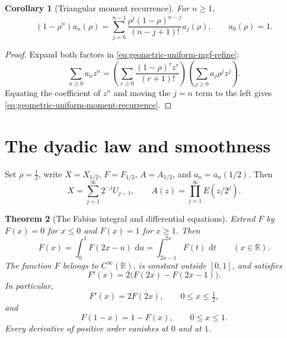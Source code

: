 \documentclass[11pt,oneside,openany]{book}
\newtheorem{theorem}{Theorem}[chapter]
\newtheorem{corollary}[theorem]{Corollary}
\theoremstyle{definition}
\theoremstyle{remark}
\newcommand{\R}{\mathbb R}
\newcommand{\dd}{\,\mathrm d}
\begin{document}
\begin{corollary}[Triangular moment recurrence]\label{cor:geometric-uniform-moment-recurrence}
For $n\ge1$,
\begin{equation}
 (1-\rho^n)a_n(\rho)
 =\sum_{j=0}^{n-1}
 \frac{\rho^j(1-\rho)^{n-j}}{(n-j+1)!}a_j(\rho),
 \qquad a_0(\rho)=1.\label{eq:geometric-uniform-moment-recurrence}
\end{equation}
\end{corollary}

\begin{proof}
Expand both factors in \eqref{eq:geometric-uniform-mgf-refine}:
\[
 \sum_{n\ge0}a_nz^n
 =\left(\sum_{r\ge0}\frac{(1-\rho)^rz^r}{(r+1)!}\right)
  \left(\sum_{j\ge0}a_j\rho^jz^j\right).
\]
Equating the coefficient of $z^n$ and moving the $j=n$ term to the left gives \eqref{eq:geometric-uniform-moment-recurrence}.
\end{proof}

\section{The dyadic law and smoothness}

Set $\rho=\tfrac12$, write $X=X_{1/2}$, $F=F_{1/2}$, $A=A_{1/2}$, and $a_n=a_n(1/2)$.  Then
\begin{equation}
 X=\sum_{j=1}^{\infty}2^{-j}U_{j-1},
 \qquad
 A(z)=\prod_{j=1}^{\infty}E(z/2^j).\label{eq:fabius-random-variable}
\end{equation}

\begin{theorem}[The Fabius integral and differential equations]\label{thm:fabius-equations}
Extend $F$ by $F(x)=0$ for $x\le0$ and $F(x)=1$ for $x\ge1$.  Then
\begin{equation}
 F(x)=\int_0^1F(2x-u)\,\dd u
     =\int_{2x-1}^{2x}F(t)\,\dd t
 \qquad(x\in\R).\label{eq:fabius-integral-equation}
\end{equation}
The function $F$ belongs to $C^\infty(\R)$, is constant outside $[0,1]$, and satisfies
\begin{equation}
 F'(x)=2\bigl(F(2x)-F(2x-1)\bigr).\label{eq:fabius-global-differential}
\end{equation}
In particular,
\begin{equation}
 F'(x)=2F(2x),\qquad 0\le x\le\tfrac12,\label{eq:fabius-left-differential}
\end{equation}
and
\begin{equation}
 F(1-x)=1-F(x),\qquad 0\le x\le1.\label{eq:fabius-symmetry}
\end{equation}
Every derivative of positive order vanishes at $0$ and at $1$.
\end{theorem}
\end{document}
